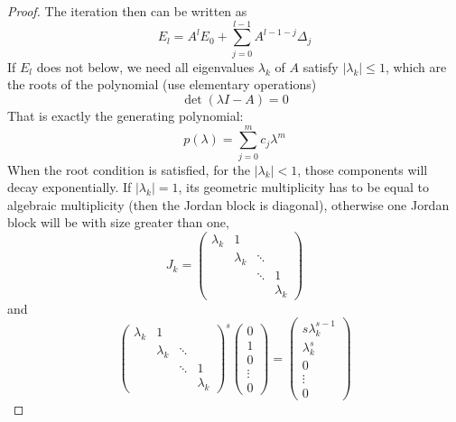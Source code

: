 \begin{proof}
    The iteration then can be written as
    \begin{equation}
        E_l = A^l E_0 + \sum_{j=0}^{l-1} A^{l-1-j} \Delta_j 
    \end{equation}
    If $E_l$ does not below, we need all eigenvalues $\lambda_k$ of $A$ satisfy $|\lambda_k|\le 1$, which are the roots of the polynomial (use elementary operations)
    $$\det(\lambda I - A) = 0$$
    That is exactly the generating polynomial:
    \begin{equation}
        p(\lambda) = \sum_{j=0}^{m} c_j \lambda^m 
    \end{equation}
    When the root condition is satisfied, for the $|\lambda_k|<1$, those components will decay exponentially. If $|\lambda_k|=1$, its geometric multiplicity has to be equal to algebraic multiplicity (then the Jordan block is diagonal), otherwise one Jordan block will be with size greater than one,
     \begin{equation}
        J_k =\begin{pmatrix}
            \lambda_k & 1 &  &  \\ 
             &\lambda_k   & \ddots & \\
             &  & \ddots & 1 \\
             &&  & \lambda_k 
        \end{pmatrix}
    \end{equation}
    and 
    \begin{equation}
        \begin{pmatrix}
            \lambda_k & 1 &  &  \\ 
             &\lambda_k   & \ddots & \\
             &  & \ddots & 1 \\
             &&  & \lambda_k 
        \end{pmatrix}^s \begin{pmatrix}
           0 \\1 \\ 0 \\ \vdots \\0
        \end{pmatrix} = \begin{pmatrix}
            s \lambda_k^{s-1} \\ \lambda_k^s \\ 0\\\vdots \\ 0 
        \end{pmatrix}
    \end{equation}   

\end{proof}

